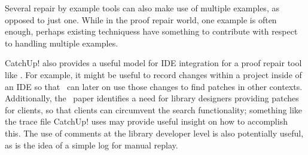 Several repair by example tools can also make use of multiple examples, as opposed to just one.
While in the proof repair world, one example is often %
enough, perhaps existing techniquess have something to contribute with respect to handling multiple examples. %

CatchUp! also provides a useful model for IDE integration for a proof repair tool like \sysname.
For example, it might be useful to record changes within a project inside of an IDE 
so that \sysname\ can later on use those changes to find patches in other contexts. %
Additionally, the \sysname\ paper identifies a need for library designers providing patches for clients,
so that clients can circumvent the search functionality; something like the trace file CatchUp! 
uses may provide useful insight on how to accomplish this. %
The use of comments at the library developer level is also potentially useful, as is the idea of a simple log for manual replay.


